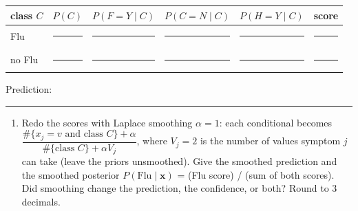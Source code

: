 \documentclass[
  11pt,
]{article}
\newcounter{none} %
\providecommand{\tightlist}{%
  \setlength{\itemsep}{0pt}\setlength{\parskip}{0pt}}
\newcommand{\answerspace}[1]{\par\vspace*{#1}}  %
\newcommand{\blank}[1][1.2in]{\rule{#1}{0.4pt}}
\begin{document}
{\def\LTcaptype{none} %
\begin{longtable}[]{@{}
  >{\raggedright\arraybackslash}p{}
  >{\raggedright\arraybackslash}p{}
  >{\raggedright\arraybackslash}p{}
  >{\raggedright\arraybackslash}p{}
  >{\raggedright\arraybackslash}p{}
  >{\raggedright\arraybackslash}p{}@{}}
\toprule\noalign{}
\begin{minipage}[b]{\linewidth}\raggedright
class \(C\)
\end{minipage} & \begin{minipage}[b]{\linewidth}\raggedright
\(P(C)\)
\end{minipage} & \begin{minipage}[b]{\linewidth}\raggedright
\(P(F{=}Y \mid C)\)
\end{minipage} & \begin{minipage}[b]{\linewidth}\raggedright
\(P(C{=}N \mid C)\)
\end{minipage} & \begin{minipage}[b]{\linewidth}\raggedright
\(P(H{=}Y \mid C)\)
\end{minipage} & \begin{minipage}[b]{\linewidth}\raggedright
score
\end{minipage} \\
\midrule\noalign{}
\endhead
\bottomrule\noalign{}
\endlastfoot
Flu & \blank[0.7in] & \blank[0.7in] & \blank[0.7in] & \blank[0.7in] &
\blank[0.7in] \\
no Flu & \blank[0.7in] & \blank[0.7in] & \blank[0.7in] & \blank[0.7in] &
\blank[0.7in] \\
\end{longtable}
}

Prediction: \blank[0.8in]

\answerspace{1.5in}

\begin{enumerate}
\def\labelenumi{(\alph{enumi})}
\setcounter{enumi}{1}
\tightlist
\item
  Redo the scores with Laplace smoothing \(\alpha = 1\): each
  conditional becomes
  \(\dfrac{\#\{x_j = v \text{ and class } C\} + \alpha}{\#\{\text{class } C\} + \alpha V_j}\),
  where \(V_j = 2\) is the number of values symptom \(j\) can take
  (leave the priors unsmoothed). Give the smoothed prediction and the
  smoothed posterior \(P(\text{Flu} \mid \mathbf{x})\) = (Flu score) /
  (sum of both scores). Did smoothing change the prediction, the
  confidence, or both? Round to 3 decimals.
\end{enumerate}
\end{document}
